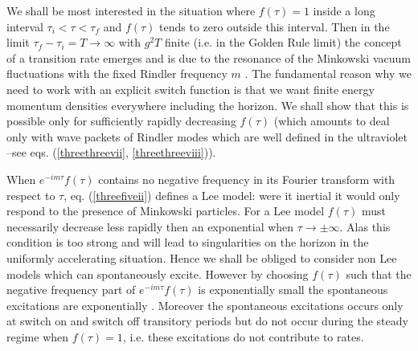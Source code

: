 \documentclass[12pt]{article}
\begin{document}
We shall be most interested in the situation where $f(\tau)=1$ inside a long
interval $\tau_i < \tau < \tau_f$ and $f(\tau)$ tends to
zero outside this interval.
Then in the limit $\tau_f-\tau_i =T \to \infty$
with $g^2 T$ finite (i.e. in the Golden Rule limit)
the concept of a transition rate
emerges
and is due to the resonance of the Minkowski vacuum fluctuations with the
fixed Rindler frequency $m$ \cite{pbt}. The
fundamental reason
why we need to work with an explicit switch function is that we want  finite
energy
momentum densities everywhere including the horizon.
We shall show that this is possible only for
sufficiently rapidly decreasing $f(\tau)$ (which
amounts to deal only with wave packets
of Rindler modes which are well defined in the ultraviolet --see eqs.
(\ref{threethreevii},
 \ref{threethreeviii})).

When
$e^{-im\tau} f(\tau)$ contains
no negative frequency in its Fourier transform with respect to $\tau$,
eq. (\ref{threefiveii}) defines
 a Lee model:
were it inertial it would only respond to the presence
of Minkowski
particles.
For a Lee model $f(\tau)$ must necessarily decrease
less
rapidly then an exponential when $\tau \rightarrow \pm \infty$. Alas
this condition is too
strong and will lead to singularities on the horizon in the
uniformly accelerating situation. Hence
we shall be obliged to consider
non Lee models which can spontaneously excite. However by
choosing $f(\tau)$ such that the negative frequency part of $e^{-im\tau}
f(\tau)$ is exponentially small the spontaneous  excitations are
exponentially . Moreover the spontaneous excitations occurs
only at
switch
on and switch off transitory periods
but do not occur during the steady regime when $f(\tau)=1$, i.e. these
excitations
do not contribute to rates.
\end{document}
